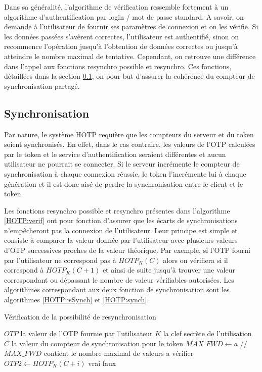 \documentclass{../res/univ-projet}
\begin{document}
  Dans sa généralité, l'algorithme de vérification ressemble fortement à un algorithme d'authentification par login / mot de passe standard. A savoir, on demande à 
  l'utilisateur de fournir ses paramètres de connexion et on les vérifie. Si les données passées s'avèrent correctes, l'utilisateur est authentifié, sinon on recommence 
  l'opération jusqu'à l'obtention de données correctes ou jusqu'à atteindre le nombre maximal de tentative. Cependant, on retrouve une différence dans l'appel aux 
  fonctions \og{}resynchro possible\fg{} et \og{}resynchro\fg{}. Ces fonctions, détaillées dans la section \ref{HOTP:synchro}, on pour but d'assurer la cohérence du 
  compteur de synchronisation partagé.
  
  \subsection{Synchronisation}
  \label{HOTP:synchro}
  Par nature, le système HOTP requière que les compteurs du serveur et du token soient synchronisés. En effet, dans le cas contraire, les valeurs de l'OTP calculées par le 
  token et le service d'authentification seraient différentes et aucun utilisateur ne pourrait se connecter.  Si le serveur incrémente le compteur de synchronisation à 
  chaque connexion réussie, le token l'incrémente lui à chaque génération et il est donc aisé de perdre la synchronisation entre le client et le token.
  
  Les fonctions \og{}resynchro possible\fg{} et \og{}resynchro\fg{} présentes dans l'algorithme \ref{HOTP:verif} ont pour fonction d'assurer que les écarts de 
  synchronisations n'empêcheront pas la connexion de l'utilisateur. Leur principe est simple et consiste à comparer la valeur donnée par l'utilisateur avec plusieurs 
  valeurs d'OTP successives proches de la valeur théorique. Par exemple, si l'OTP fourni par l'utilisateur ne correspond pas à $HOTP_K(C)$ alors on vérifiera si il 
  correspond à $HOTP_K(C + 1)$ et ainsi de suite jusqu'à trouver une valeur correspondant ou dépassant le nombre de valeur vérifiables autorisées. Les algorithmes 
  correspondant aux deux fonction de synchronisation sont les algorithmes \ref{HOTP:isSynch} et \ref{HOTP:synch}.

  \begin{algorithm}
    \caption{Vérification de la possibilité de resynchronisation}
    \label{HOTP:isSynch}
    
    \begin{algorithmic}
      \REQUIRE $OTP$ la valeur de l'OTP fournie par l'utilisateur
      \REQUIRE $K$ la clef secrète de l'utilisation
      \REQUIRE $C$ la valeur du compteur de synchronisation pour le token
      \STATE $MAX\_FWD \leftarrow a$ //$MAX\_FWD$ contient le nombre maximal de valeurs a vérifier
	\STATE $OTP2 \leftarrow HOTP_K(C + i)$
	  \RETURN vrai
	\ENDIF
      \ENDFOR
      \RETURN faux
    \end{algorithmic}
  \end{algorithm}
  
\end{document}
